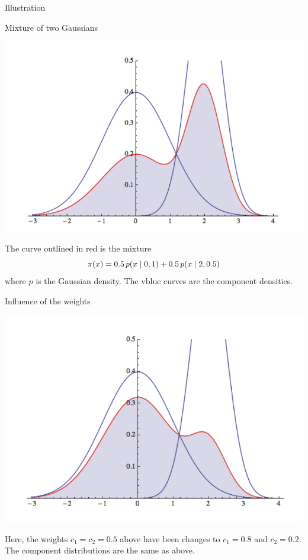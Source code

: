 \documentclass[10pt]{beamer}
\begin{document}

\begin{frame}{Illustration}
\begin{sblock}{Mixture of two Gaussians}
\begin{minipage}{0.4\textwidth}
\includegraphics[width=\textwidth]{images/gmm_weights_1}
\end{minipage} 
\hfill 
\begin{minipage}{0.5\textwidth}
The curve outlined in red is the mixture
\[ \pi(x) = 0.5 \, p(x \; | \; 0, 1) + 0.5 \, p(x \; | \; 2, 0.5) \]
where $p$ is the Gaussian density.  The vblue curves are the component densities.
\end{minipage} 

\end{sblock}
\vfill

\begin{sblock}{Influence of the weights}
\begin{minipage}{0.4\textwidth}
\includegraphics[width=\textwidth]{images/gmm_weights_2}
\end{minipage} 
\hfill 
\begin{minipage}{0.5\textwidth}
Here, the weights $c_1=c_2 =0.5$ above have been changes to $c_1 = 0.8$ and $c_2 = 0.2$.  The component distributions are the same as above. 
\end{minipage} 

\end{sblock}
\end{frame}
\end{document}
